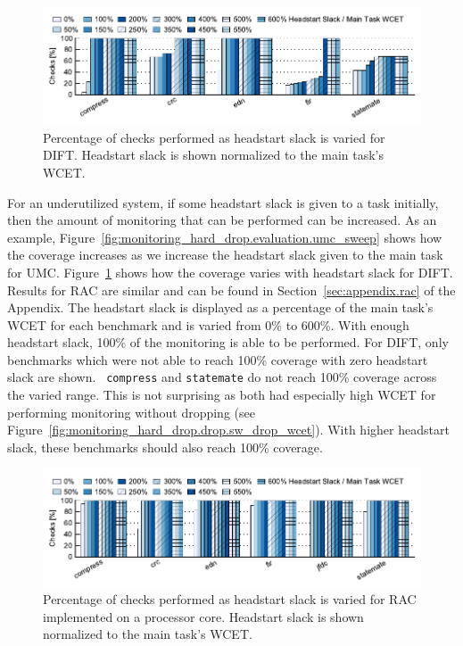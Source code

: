 \begin{figure}
  \begin{center}
    \includegraphics{monitoring_hard_drop/data/dift_sweep.pdf}
    \caption{Percentage of checks performed as headstart slack is varied for
    DIFT. Headstart slack is shown normalized to the main task's WCET.}
    \label{fig:monitoring_hard_drop.evaluation.dift_sweep}
  \end{center}
\end{figure}

For an underutilized system, if some headstart slack is given to a task
initially, then the amount of monitoring that can be performed can be
increased. As an example,
Figure~\ref{fig:monitoring_hard_drop.evaluation.umc_sweep} shows how the
coverage increases as we increase the headstart slack given to the main task
for UMC. Figure~\ref{fig:monitoring_hard_drop.evaluation.dift_sweep} shows how
the coverage varies with headstart slack for DIFT. Results for RAC are similar
and can be found in Section~\ref{sec:appendix.rac} of the Appendix.  The
headstart slack is displayed as a percentage of the main task's WCET for each
benchmark and is varied from 0\% to 600\%. With enough headstart slack, 100\%
of the monitoring is able to be performed. For DIFT, only benchmarks which were
not able to reach 100\% coverage with zero headstart slack are shown.  {\tt
compress} and {\tt statemate} do not reach 100\% coverage across the varied
range. This is not surprising as both had especially high WCET for performing
monitoring without dropping (see
Figure~\ref{fig:monitoring_hard_drop.drop.sw_drop_wcet}). With higher headstart
slack, these benchmarks should also reach 100\% coverage.

\begin{figure}
  \begin{center}
    \includegraphics{monitoring_hard_drop/data/lrc_sweep.pdf}
    \caption{Percentage of checks performed as headstart slack is varied for
    RAC implemented on a processor core. Headstart slack is shown normalized
    to the main task's WCET.}
    \label{fig:monitoring_hard_drop.evaluation.lrc_sweep}
  \end{center}
\end{figure}

